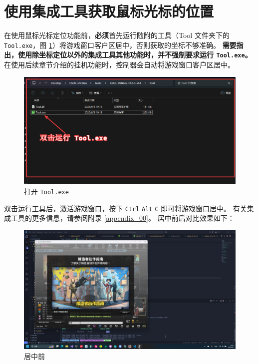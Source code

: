 \section{使用集成工具获取鼠标光标的位置}

在使用鼠标光标定位功能前，\textbf{\color{red}必须}首先运行随附的工具（Tool 文件夹下的 \lstinline{Tool.exe}，图 \ref{ch2fig-run-tool}）将游戏窗口客户区居中，否则获取的坐标不够准确。
\textbf{需要指出，\color{red}使用除坐标定位以外的集成工具其他功能时，并不强制要求运行 \lstinline{Tool.exe}。}
在使用后续章节介绍的挂机功能时，控制器会自动将游戏窗口客户区居中。

\begin{figure}[H]
    \Centering
    \includegraphics[width=\textwidth]{assets/run_tool.png}
    \caption{打开 \lstinline{Tool.exe}}
    \label{ch2fig-run-tool}
\end{figure}

双击运行工具后，激活游戏窗口，按下 \lstinline{Ctrl} \lstinline{Alt} \lstinline{C} 即可将游戏窗口居中。
有关集成工具的更多信息，请参阅附录 \ref{appendix_00}。
居中前后对比效果如下：
    
\begin{figure}[H]
    \Centering
    \includegraphics[width=\textwidth]{assets/before_center.png}
    \caption{居中前}
    \label{ch2fig-before-center}
\end{figure}

